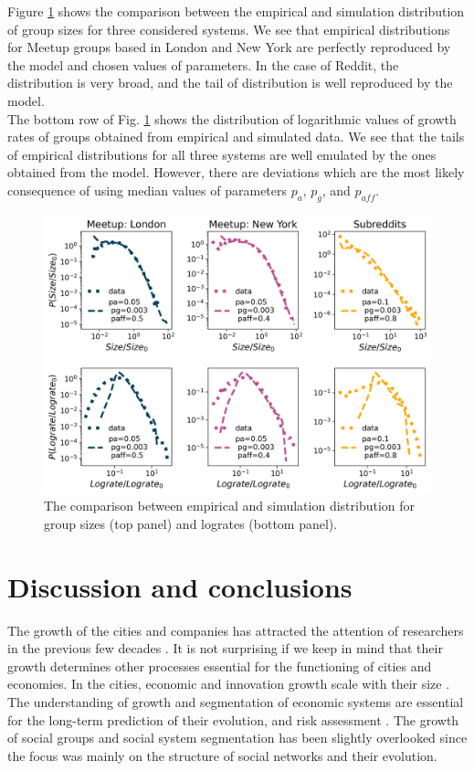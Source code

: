 Figure \ref{fig:fig6} shows the comparison between the empirical and simulation distribution of group sizes for three considered systems. We see that empirical distributions for Meetup groups based in London and New York are perfectly reproduced by the model and chosen values of parameters. In the case of Reddit, the distribution is very broad, and the tail of distribution is well reproduced by the model.\\
The bottom row of Fig. \ref{fig:fig6} shows the distribution of logarithmic values of growth rates of groups obtained from empirical and simulated data. We see that the tails of empirical distributions for all three systems are well emulated by the ones obtained from the model. However, there are deviations which are the most likely consequence of using median values of parameters $p_{a}$, $p_{g}$, and $p_{aff}$.\\
\begin{figure}[h!]
	\centering
	\includegraphics[width=0.8\linewidth]{Figures/figures/Fig4.png}
	\caption{The comparison between empirical and simulation distribution for group sizes (top panel) and logrates (bottom panel).}
	\label{fig:fig6}
\end{figure}


\section{Discussion and conclusions \label{sec:con}}

The growth of the cities and companies has attracted the attention of researchers in the previous few decades \cite{fazio2015pareto, amaral1997scaling,}. It is not surprising if we keep in mind that their growth determines other processes essential for the functioning of cities and economies. In the cities, economic and innovation growth scale with their size \cite{bettencourt2007growth}. The understanding of growth and segmentation of economic systems are essential for the long-term prediction of their evolution, and risk assessment \cite{}. The growth of social groups and social system segmentation has been slightly overlooked since the focus was mainly on the structure of social networks and their evolution.

